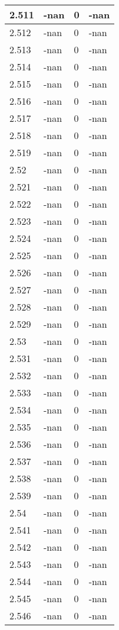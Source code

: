 \documentclass[a4paper,14pt]{extarticle}
\begin{document}
\begin{longtable}{||m{3cm}||m{3cm}|m{3cm}||m{3cm}||}
\hline
2.511 & -nan & 0 & -nan\\
\hline
2.512 & -nan & 0 & -nan\\
\hline
2.513 & -nan & 0 & -nan\\
\hline
2.514 & -nan & 0 & -nan\\
\hline
2.515 & -nan & 0 & -nan\\
\hline
2.516 & -nan & 0 & -nan\\
\hline
2.517 & -nan & 0 & -nan\\
\hline
2.518 & -nan & 0 & -nan\\
\hline
2.519 & -nan & 0 & -nan\\
\hline
2.52 & -nan & 0 & -nan\\
\hline
2.521 & -nan & 0 & -nan\\
\hline
2.522 & -nan & 0 & -nan\\
\hline
2.523 & -nan & 0 & -nan\\
\hline
2.524 & -nan & 0 & -nan\\
\hline
2.525 & -nan & 0 & -nan\\
\hline
2.526 & -nan & 0 & -nan\\
\hline
2.527 & -nan & 0 & -nan\\
\hline
2.528 & -nan & 0 & -nan\\
\hline
2.529 & -nan & 0 & -nan\\
\hline
2.53 & -nan & 0 & -nan\\
\hline
2.531 & -nan & 0 & -nan\\
\hline
2.532 & -nan & 0 & -nan\\
\hline
2.533 & -nan & 0 & -nan\\
\hline
2.534 & -nan & 0 & -nan\\
\hline
2.535 & -nan & 0 & -nan\\
\hline
2.536 & -nan & 0 & -nan\\
\hline
2.537 & -nan & 0 & -nan\\
\hline
2.538 & -nan & 0 & -nan\\
\hline
2.539 & -nan & 0 & -nan\\
\hline
2.54 & -nan & 0 & -nan\\
\hline
2.541 & -nan & 0 & -nan\\
\hline
2.542 & -nan & 0 & -nan\\
\hline
2.543 & -nan & 0 & -nan\\
\hline
2.544 & -nan & 0 & -nan\\
\hline
2.545 & -nan & 0 & -nan\\
\hline
2.546 & -nan & 0 & -nan\\

\end{longtable}
\end{document}
